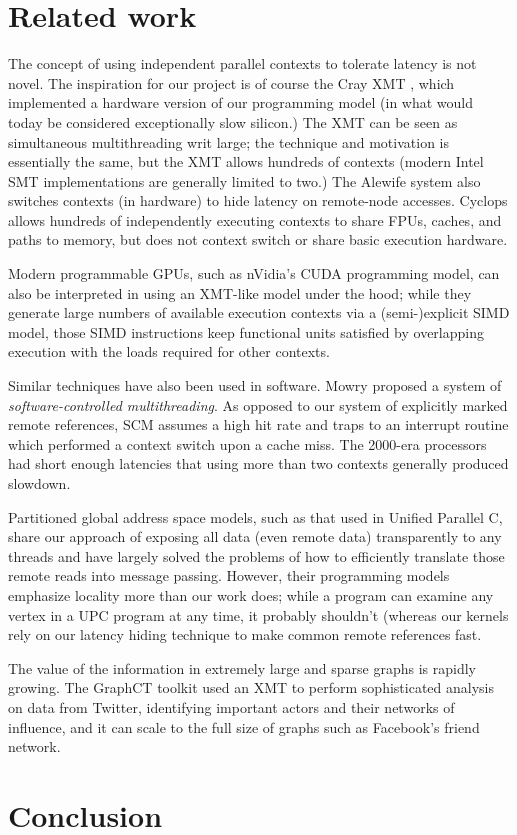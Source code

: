 \documentclass[10pt,nocopyrightspace,preprint]{sigplanconf}
\begin{document}
\section{Related work}
\label{sec:related}
The concept of using independent parallel contexts to tolerate latency
is not novel.  The inspiration for our project is of course the Cray
XMT \cite{feo-xmt}, which implemented a hardware version of our
programming model (in what would today be considered exceptionally
slow silicon.)  The XMT can be seen as simultaneous multithreading
\cite{tullsen-smt} writ large; the technique and motivation is
essentially the same, but the XMT allows hundreds of contexts (modern
Intel SMT implementations are generally limited to two.) The Alewife
system \cite{agarwal-alewife} also switches contexts (in hardware) to
hide latency on remote-node accesses.  Cyclops \cite{almasi-cyclops}
allows hundreds of independently executing contexts to share FPUs,
caches, and paths to memory, but does not context switch or share
basic execution hardware.  

Modern programmable GPUs, such as nVidia's CUDA programming model, can also be interpreted in using an XMT-like
model under the hood;
while they generate large numbers of available execution contexts via
a (semi-)explicit SIMD model, those SIMD instructions keep functional
units satisfied by overlapping execution with the loads required for
other contexts.

Similar techniques have also been used in software.  Mowry proposed a system \cite{mowry-scm} of \emph{software-controlled
  multithreading}.  As opposed to our system of explicitly marked
remote references, SCM assumes a high hit rate and traps to an
interrupt routine which performed a context switch upon a cache miss.  The 2000-era processors had
short enough latencies that using more than two contexts generally
produced slowdown.

Partitioned global address space models, such as that used in Unified Parallel C,
 share our approach of exposing all data (even remote data)
 transparently to any threads and have largely solved the problems of
 how to efficiently translate those remote reads into message
 passing.  However, their programming models emphasize locality more
 than our work does; while a program can examine any vertex in a UPC
 program at any time, it probably shouldn't (whereas our kernels rely on our
 latency hiding technique to make common remote references fast.

The value of the information in extremely large and sparse graphs is
rapidly growing.  The GraphCT toolkit \cite{ediger-graphct} used an XMT to perform
sophisticated analysis on data from Twitter, identifying important
actors and their networks of influence, and it can scale to the full
size of graphs such as Facebook's friend network.

\section{Conclusion}
\label{sec:conclusion}




\end{document}
